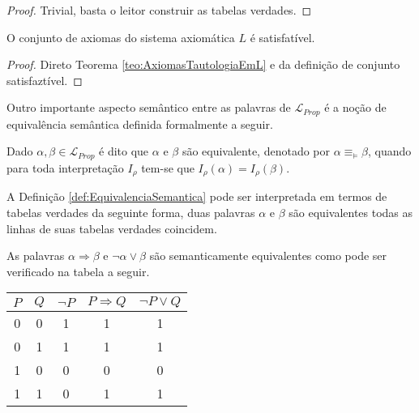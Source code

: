 \begin{proof}
    Trivial, basta o leitor construir as tabelas verdades.
\end{proof}

\begin{corollary}\label{col:AxiomasTautologiaEmL}
    O conjunto de axiomas do sistema axiomática $L$ é satisfatível.
\end{corollary}

\begin{proof}
    Direto Teorema \ref{teo:AxiomasTautologiaEmL} e da definição de conjunto satisfaztível.
\end{proof}

Outro importante aspecto semântico entre as palavras de $\mathcal{L}_{Prop}$ é a noção de equivalência semântica definida formalmente a seguir.

\begin{definition}\label{def:EquivalenciaSemantica}
    Dado $\alpha, \beta \in \mathcal{L}_{Prop}$ é dito que $\alpha$ e $\beta$ são equivalente, denotado por $\alpha \equiv_\vDash \beta$, quando para toda interpretação $I_\rho$ tem-se que $I_\rho(\alpha) = I_\rho(\beta)$.
\end{definition}

\begin{rema}
    A Definição \ref{def:EquivalenciaSemantica} pode ser interpretada em termos de tabelas verdades da seguinte forma, duas palavras $\alpha$ e $\beta$ são equivalentes todas as linhas de suas tabelas verdades coincidem.
\end{rema}

\begin{exem}
    As palavras $\alpha \Rightarrow \beta$ e $\neg \alpha \lor \beta$ são semanticamente equivalentes como pode ser verificado na tabela a seguir.
    \begin{table*}[ht]
        \centering
        \scriptsize
        \begin{tabular}{|c|c|c|c|c|}
             \hline
             $P$ & $Q$ & $\neg P$ & $P \Rightarrow Q$ & $\neg P \lor Q$\\
             \hline
             0 & 0 & 1 & 1 & 1\\ \hline
             0 & 1 & 1 & 1 & 1\\ \hline
             1 & 0 & 0 & 0 & 0\\ \hline
             1 & 1 & 0 & 1 & 1\\ \hline
        \end{tabular}
    \end{table*}
\end{exem}

